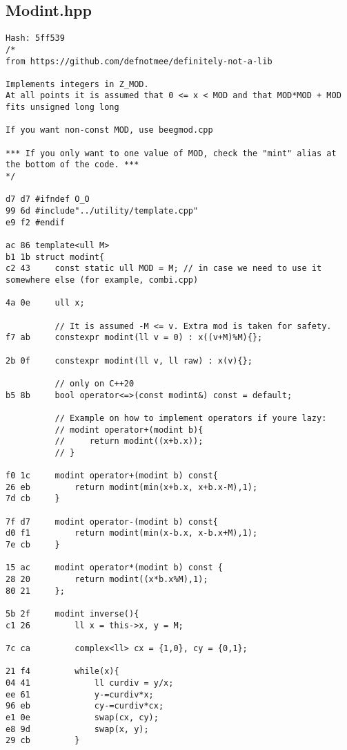 \documentclass[11pt, a4paper, twoside]{article}
\begin{document}
\subsection{Modint.hpp}
\begin{lstlisting}
Hash: 5ff539
/*
from https://github.com/defnotmee/definitely-not-a-lib

Implements integers in Z_MOD.
At all points it is assumed that 0 <= x < MOD and that MOD*MOD + MOD fits unsigned long long

If you want non-const MOD, use beegmod.cpp

*** If you only want to one value of MOD, check the "mint" alias at the bottom of the code. ***
*/

d7 d7 #ifndef O_O
99 6d #include"../utility/template.cpp"
e9 f2 #endif

ac 86 template<ull M> 
b1 1b struct modint{
c2 43     const static ull MOD = M; // in case we need to use it somewhere else (for example, combi.cpp)
      
4a 0e     ull x;
      
          // It is assumed -M <= v. Extra mod is taken for safety.
f7 ab     constexpr modint(ll v = 0) : x((v+M)%M){};
      
2b 0f     constexpr modint(ll v, ll raw) : x(v){};
      
          // only on C++20
b5 8b     bool operator<=>(const modint&) const = default;
      
          // Example on how to implement operators if youre lazy:
          // modint operator+(modint b){
          //     return modint((x+b.x));
          // }
      
f0 1c     modint operator+(modint b) const{
26 eb         return modint(min(x+b.x, x+b.x-M),1);
7d cb     }
      
7f d7     modint operator-(modint b) const{
d0 f1         return modint(min(x-b.x, x-b.x+M),1);
7e cb     }
      
15 ac     modint operator*(modint b) const {
28 20         return modint((x*b.x%M),1);
80 21     };
      
5b 2f     modint inverse(){
c1 26         ll x = this->x, y = M;
      
7c ca         complex<ll> cx = {1,0}, cy = {0,1};
      
21 f4         while(x){
04 41             ll curdiv = y/x;
ee 61             y-=curdiv*x;
96 eb             cy-=curdiv*cx;
e1 0e             swap(cx, cy);
e8 9d             swap(x, y);
29 cb         }
      

\end{lstlisting}
\end{document}
